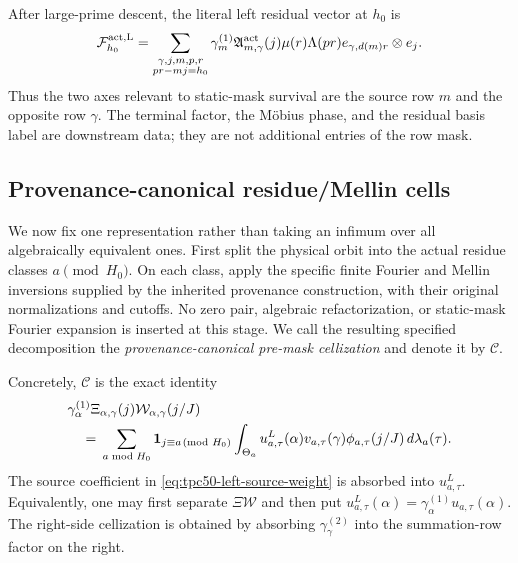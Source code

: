 After large-prime descent, the literal left residual vector at \(h_0\)
is
\begin{equation}
 \mathcal F_{h_0}^{\rm act,L}
 =\sum_{\substack{\gamma,j,m,p,r\\pr-mj=h_0}}
 \gamma_m^{(1)}\mathfrak A_{m,\gamma}^{\rm act}(j)
 \mu(r)\Lambda(pr)e_{\gamma,d(m)r}\otimes e_j.
 \label{eq:tpc50-physical-residual-vector}
\end{equation}
Thus the two axes relevant to static-mask survival are the source row
\(m\) and the opposite row \(\gamma\).  The terminal factor, the
M\"obius phase, and the residual basis label are downstream data; they
are not additional entries of the row mask.

\subsection{Provenance-canonical residue/Mellin cells}

We now fix one representation rather than taking an infimum over all
algebraically equivalent ones.  First split the physical orbit into the
actual residue classes \(a\pmod {H_0}\).  On each class, apply the
specific finite Fourier and Mellin inversions supplied by the inherited
provenance construction, with their original normalizations and
cutoffs.  No zero pair, algebraic refactorization, or static-mask
Fourier expansion is inserted at this stage.  We call the resulting
specified decomposition the \emph{provenance-canonical pre-mask
cellization} and denote it by \(\mathscr C\).

Concretely, \(\mathscr C\) is the exact identity
\begin{align}
 &\gamma_\alpha^{(1)}
  \Xi_{\alpha,\gamma}(j)
  \mathcal W_{\alpha,\gamma}(j/J)
 \notag\\
 &\quad={}
 \sum_{a\bmod H_0}
 \mathbf 1_{j\equiv a\!\!\pmod {H_0}}
 \int_{\Theta_a}
 u_{a,\tau}^{L}(\alpha)v_{a,\tau}(\gamma)
 \phi_{a,\tau}(j/J)\,d\lambda_a(\tau).
 \label{eq:tpc50-canonical-pre-mask-cellization}
\end{align}
The source coefficient in \eqref{eq:tpc50-left-source-weight} is
absorbed into \(u_{a,\tau}^{L}\).  Equivalently, one may first separate
\(\Xi\mathcal W\) and then put
\(u_{a,\tau}^{L}(\alpha)=
\gamma_\alpha^{(1)}u_{a,\tau}(\alpha)\).  The right-side cellization is
obtained by absorbing \(\gamma_\gamma^{(2)}\) into the summation-row
factor on the right.

